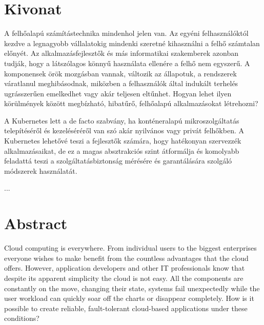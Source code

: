 \setcounter{page}{1}

\selecthungarian

\chapter*{Kivonat}

A felhőalapú számítástechnika mindenhol jelen van. Az egyéni felhasználóktól kezdve a legnagyobb vállalatokig mindenki szeretné kihasználni a felhő számtalan előnyét. Az alkalmazásfejlesztők és más informatikai szakemberek azonban tudják, hogy a látszólagos könnyű használata ellenére a felhő nem egyszerű. A komponensek örök mozgásban vannak, változik az állapotuk, a rendszerek váratlanul meghibásodnak, miközben a felhasználók által indukált terhelés ugrásszerűen emelkedhet vagy akár teljesen eltűnhet. Hogyan lehet ilyen körülmények között megbízható, hibatűrő, felhőalapú alkalmazásokat létrehozni?

A Kubernetes lett a de facto szabvány, ha konténeralapú mikroszolgáltatás telepítéséről és kezeléséréről van szó akár nyilvános vagy privát felhőkben. A Kubernetes lehetővé teszi a fejlesztők számára, hogy hatékonyan szervezzék alkalmazásaikat, de ez a magas absztrakciós szint átformálja és komolyabb feladattá teszi a szolgáltatásbiztonság mérésére és garantálására szolgáló módszerek használatát.

...

\vfill
\selectenglish


\chapter*{Abstract}

Cloud computing is everywhere. From individual users to the biggest enterprises everyone wishes to make benefit from the countless advantages that the cloud offers. However, application developers and other IT professionals know that despite its apparent simplicity the cloud is not easy. All the components are constantly on the move, changing their state, systems fail unexpectedly while the user workload can quickly soar off the charts or disappear completely. How is it possible to create reliable, fault-tolerant cloud-based applications under these conditions?

